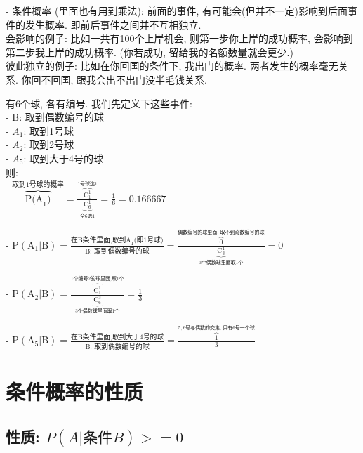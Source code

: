 \documentclass[UTF8]{ctexart}
\begin{document}
	- 条件概率 (里面也有用到乘法): 前面的事件, 有可能会(但并不一定)影响到后面事件的发生概率. 即前后事件之间并不互相独立.  \\
	会影响的例子: 比如一共有100个上岸机会, 则第一步你上岸的成功概率, 会影响到第二步我上岸的成功概率. (你若成功, 留给我的名额数量就会更少.) \\
	彼此独立的例子: 比如在你回国的条件下, 我出门的概率. 两者发生的概率毫无关系. 你回不回国, 跟我会出不出门没半毛钱关系.

		
	
	
	\begin{myEnvSample}
		有6个球, 各有编号.  我们先定义下这些事件: \\
		- B: 取到偶数编号的球 \\
		- $A_1$: 取到1号球 \\
		- $A_2$: 取到2号球 \\
		- $A_5$: 取到大于4号的球 \\
		
		则: \\
		- $
		\overset{\text{取到1号球的概率}}{\overbrace{\text{P(A}_1\text{)}}}=\frac{\overset{1\text{号球选}1}{\overbrace{\text{C}_{1}^{1}}}}{\underset{\text{全6选}1}{\underbrace{\text{C}_{6}^{1}}}}=\frac{1}{6}=0.166667
		$
		
		- $
		\text{P}\left( \text{A}_1|\text{B} \right) =\frac{\text{在B条件里面,取到A}_1\text{(即1号球)}}{\text{B:\ 取到偶数编号的球}}=\frac{\overset{\text{偶数编号的球里面,\ 取不到奇数编号的球}}{\overbrace{0}}}{\underset{3\text{个偶数球里面取1个}}{\underbrace{\text{C}_{3}^{1}}}}=0
		$
		
		- $
		\text{P}\left( \text{A}_2|\text{B} \right) =\frac{\overset{1\text{个编号2的球里面,取1个}}{\overbrace{\text{C}_{1}^{1}}}}{\underset{3\text{个偶数球里面取1个}}{\underbrace{\text{C}_{6}^{3}}}}=\frac{1}{3}
		$
		
		- $
		\text{P}\left( \text{A}_5|\text{B} \right) =\frac{\text{在B条件里面,取到大于4号的球}}{\text{B:\ 取到偶数编号的球}}=\frac{\overset{5,6\text{号与偶数的交集,\ 只有6号一个球}}{\overbrace{1}}}{3}
		$
			
	\end{myEnvSample}
	
	

	
	\section{条件概率的性质}
	
	\subsection{性质: $ P(A | \text{条件}B) >= 0$}
	
\end{document}

